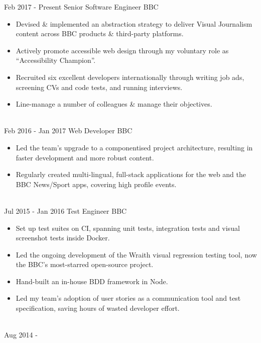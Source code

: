 \documentclass[letterpaper]{twentysecondcv} %
\begin{document}
\begin{twenty} %
    \twentyitem
    	{Feb 2017 -}
		{Present}
        {Senior Software Engineer}
        {BBC}
        {}
        {
        \begin{itemize}
        \item Devised \& implemented an abstraction strategy to deliver Visual Journalism content across BBC products \& third-party platforms.
        \item Actively promote accessible web design through my voluntary role as ``Accessibility Champion''.
        \item Recruited six excellent developers internationally through writing job ads, screening CVs and code tests, and running interviews.
        \item Line-manage a number of colleagues \& manage their objectives.
    \end{itemize}
    	}
    \\
	\twentyitem
    	{Feb 2016 -}
		{Jan 2017}
        {Web Developer}
        {BBC}
        {}
        {
        {\begin{itemize}
        \item Led the team's upgrade to a componentised project architecture, resulting in faster development and more robust content.
        \item Regularly created multi-lingual, full-stack applications for the web and the BBC News/Sport apps, covering high profile events.
    \end{itemize}}
        }
    \\
    \twentyitem
  		{Jul 2015 -}
		{Jan 2016}
        {Test Engineer}
        {BBC}
        {}
        {
        {\begin{itemize}
        \item Set up test suites on CI, spanning unit tests, integration tests and visual screenshot tests inside Docker.
        \item Led the ongoing development of the Wraith visual regression testing tool, now the BBC's most-starred open-source project.
        \item Hand-built an in-house BDD framework in Node.
        \item Led my team's adoption of user stories as a communication tool and test specification, saving hours of wasted developer effort.
    \end{itemize}}
        }
     \\
     \twentyitem
   		{Aug 2014 -}

\end{twenty}
\end{document}

